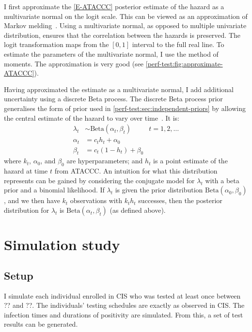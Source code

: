 \documentclass[thesis.tex]{subfiles}
\begin{document}
I first approximate the \cref{E-ATACCC} posterior estimate of the hazard as a multivariate normal on the logit scale.
This can be viewed as an approximation of Markov melding~\autocite{goudieJoining}.
Using a multivariate normal, as opposed to multiple univariate distribution, ensures that the correlation between the hazards is preserved.
The logit transformation maps from the $[0, 1]$ interval to the full real line.
To estimate the parameters of the multivariate normal, I use the method of moments.
The approximation is very good (see \cref{perf-test:fig:approximate-ATACCC}).


Having approximated the estimate as a multivariate normal, I add additional uncertainty using a discrete Beta process.
The discrete Beta process prior generalises the form of prior used in \cref{perf-test:sec:independent-priors} by allowing the central estimate of the hazard to vary over time~\autocites{ibrahimBayesian}{sunStatisticala}.
It is:
\begin{align}
  \lambda_t &\sim \text{Beta}(\alpha_t, \beta_t) &t = 1, 2, \dots \\
  \alpha_t &= c_t h_t + \alpha_0 \\
  \beta_t &= c_t (1 - h_t) + \beta_0
\end{align}
where $k_t$, $\alpha_0$, and $\beta_0$ are hyperparameters; and $h_t$ is a point estimate of the hazard at time $t$ from ATACCC.
An intuition for what this distribution represents can be gained by considering the conjugate model for $\lambda_t$ with a beta prior and a binomial likelihood.
If $\lambda_t$ is given the prior distribution $\text{Beta}(\alpha_0, \beta_0)$, and we then have $k_t$ observations with $k_t h_t$ successes, then the posterior distribution for $\lambda_t$ is $\text{Beta}(\alpha_t, \beta_t)$ (as defined above).

\section{Simulation study} \label{perf-test:sec:simulation-study}

\subsection{Setup}

I simulate each individual enrolled in CIS who was tested at least once between ?? and ??.
The individuals' testing schedules are exactly as observed in CIS.
The infection times and durations of positivity are simulated.
From this, a set of test results can be generated.
\end{document}
